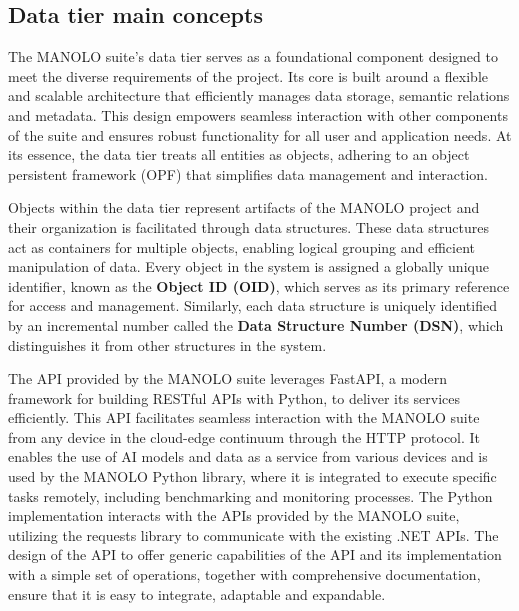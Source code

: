 \subsection{Data tier main concepts}
The MANOLO suite’s data tier serves as a foundational component designed to meet the diverse requirements of the project. Its core is built around a flexible and scalable architecture that efficiently manages data storage, semantic relations and metadata. This design empowers seamless interaction with other components of the suite and ensures robust functionality for all user and application needs. At its essence, the data tier treats all entities as objects, adhering to an object persistent framework (OPF) that simplifies data management and interaction.

Objects within the data tier represent artifacts of the MANOLO project and their organization is facilitated through data structures. These data structures act as containers for multiple objects, enabling logical grouping and efficient manipulation of data. Every object in the system is assigned a globally unique identifier, known as the \textbf{Object ID (OID)}, which serves as its primary reference for access and management. Similarly, each data structure is uniquely identified by an incremental number called the \textbf{Data Structure Number (DSN)}, which distinguishes it from other structures in the system.

The API provided by the MANOLO suite leverages FastAPI, a modern framework for building RESTful APIs with Python, to deliver its services efficiently. This API facilitates seamless interaction with the MANOLO suite from any device in the cloud-edge continuum through the HTTP protocol. It enables the use of AI models and data as a service from various devices and is used by the MANOLO Python library, where it is integrated to execute specific tasks remotely, including benchmarking and monitoring processes. The Python implementation interacts with the APIs provided by the MANOLO suite, utilizing the requests library to communicate with the existing .NET APIs. The design of the API to offer generic capabilities of the API and its implementation with a simple set of operations, together with comprehensive documentation, ensure that it is easy to integrate, adaptable and expandable.

